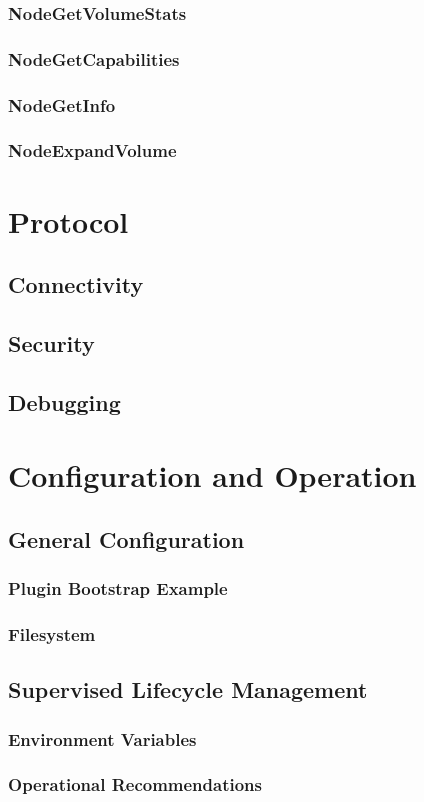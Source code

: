 \documentclass[12pt]{article}
\begin{document}
\subsubsection{NodeGetVolumeStats}
\subsubsection{NodeGetCapabilities}
\subsubsection{NodeGetInfo}
\subsubsection{NodeExpandVolume}

\newpage
\section{Protocol}
\subsection{Connectivity}
\subsection{Security}
\subsection{Debugging}

\newpage
\section{Configuration and Operation}
\subsection{General Configuration}
\subsubsection{Plugin Bootstrap Example}
\subsubsection{Filesystem}
\subsection{Supervised Lifecycle Management}
\subsubsection{Environment Variables}
\subsubsection{Operational Recommendations}
\end{document}

